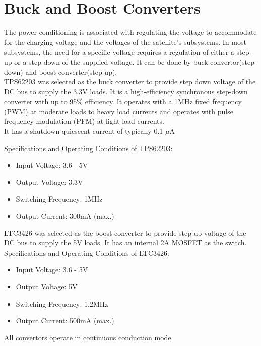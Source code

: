 \section[Switching Regulators]{Buck and Boost Converters}
The power conditioning is associated with regulating the voltage to accommodate
for the charging voltage and the voltages of the satellite's subsystems. In most
subsystems, the need for a specific voltage requires a regulation of either a step-up
or a step-down of the supplied voltage. It can be done by buck
convertor(step-down) and boost converter(step-up).\\
TPS62203 was selected as the buck converter to provide step down voltage of the DC bus to supply the 3.3V loads. It is a high-efficiency synchronous step-down converter with up to 95\% efficiency. It operates with a 1MHz fixed frequency (PWM) at moderate loads to heavy load currents and operates with pulse
frequency modulation (PFM) at light load currents.\\

It has a shutdown quiescent current of typically 0.1 {$\mu$}A

 Specifications and Operating Conditions of TPS62203:
\begin{itemize}
	\item Input Voltage: 3.6 - 5V
	\item Output Voltage:  3.3V
	\item Switching Frequency: 1MHz
	\item Output Current: 300mA (max.)
\end{itemize}


 LTC3426 was selected as the boost converter to provide step up voltage of the DC bus to supply the 5V loads. It has an internal 2A MOSFET as the switch.\\
 
  Specifications and Operating Conditions of LTC3426:
 \begin{itemize}
 	\item Input Voltage: 3.6 - 5V
 	\item Output Voltage: 5V
 	\item Switching Frequency: 1.2MHz
 	\item Output Current: 500mA (max.)
 \end{itemize}
All convertors operate in continuous conduction mode.\\

